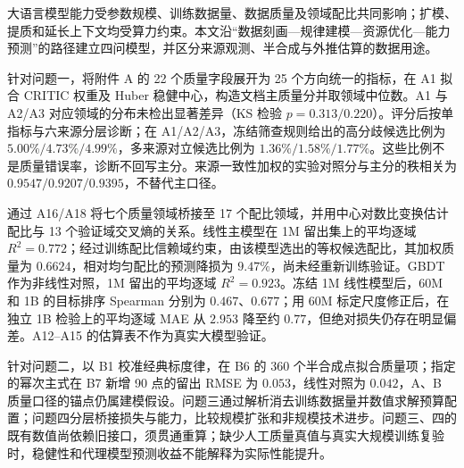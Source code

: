 大语言模型能力受参数规模、训练数据量、数据质量及领域配比共同影响；扩模、提质和延长上下文均受算力约束。本文沿“数据刻画—规律建模—资源优化—能力预测”的路径建立四问模型，并区分来源观测、半合成与外推估算的数据用途。

针对问题一，将附件 A 的 22 个质量字段展开为 25 个方向统一的指标，在 A1 拟合 CRITIC 权重及 Huber 稳健中心，构造文档主质量分并取领域中位数。A1 与 A2/A3 对应领域的分布未检出显著差异（KS 检验 $p=0.313/0.220$）。评分后按单指标与六来源分层诊断；在 A1/A2/A3，冻结筛查规则给出的高分歧候选比例为 $5.00\%/4.73\%/4.99\%$，多来源对立候选比例为 $1.36\%/1.58\%/1.77\%$。这些比例不是质量错误率，诊断不回写主分。来源一致性加权的实验对照分与主分的秩相关为 $0.9547/0.9207/0.9395$，不替代主口径。

通过 A16/A18 将七个质量领域桥接至 17 个配比领域，并用中心对数比变换估计配比与 13 个验证域交叉熵的关系。线性主模型在 1M 留出集上的平均逐域 $R^2=0.772$；经过训练配比信赖域约束，由该模型选出的等权候选配比，其加权质量为 $0.6624$，相对均匀配比的预测降损为 $9.47\%$，尚未经重新训练验证。GBDT 作为非线性对照，1M 留出的平均逐域 $R^2=0.923$。冻结 1M 线性模型后，60M 和 1B 的目标排序 Spearman 分别为 $0.467$、$0.677$；用 60M 标定尺度修正后，在独立 1B 检验上的平均逐域 MAE 从 $2.953$ 降至约 $0.77$，但绝对损失仍存在明显偏差。A12--A15 的估算表不作为真实大模型验证。

针对问题二，以 B1 校准经典标度律，在 B6 的 360 个半合成点拟合质量项；指定的幂次主式在 B7 新增 90 点的留出 RMSE 为 $0.053$，线性对照为 $0.042$，A、B 质量口径的锚点仍属建模假设。问题三通过解析消去训练数据量并数值求解预算配置；问题四分层桥接损失与能力，比较规模扩张和非规模技术进步。问题三、四的既有数值尚依赖旧接口，须贯通重算；缺少人工质量真值与真实大规模训练复验时，稳健性和代理模型预测收益不能解释为实际性能提升。

